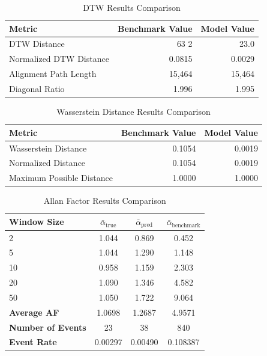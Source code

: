\begin{table}[H]
    \centering
    \caption{DTW Results Comparison} \label{tb:dtw_com}
    \begin{tabular}{lrr}
    \toprule
    Metric & Benchmark Value & Model Value\\
    \midrule
    DTW Distance & 63 2& 23.0 \\  %
    Normalized DTW Distance & 0.0815 & 0.0029 \\  %
    Alignment Path Length & 15,464 & 15,464 \\
    Diagonal Ratio & 1.996 & 1.995 \\   %
    \bottomrule
    \end{tabular}
\end{table}

\begin{table}[H]
    \centering
    \caption{Wasserstein Distance Results Comparison}
    \label{tb:wasserstein_com}
    \begin{tabular}{lrr}
    \toprule
    Metric & Benchmark Value & Model Value\\
    \midrule
    Wasserstein Distance & 0.1054 & 0.0019 \\  %
    Normalized Distance & 0.1054 & 0.0019 \\  %
    Maximum Possible Distance & 1.0000 & 1.0000 \\
    \bottomrule
    \end{tabular}
\end{table}

\begin{table}[H]
    \centering
    \caption{Allan Factor Results Comparison}
    \label{tb:allan-factor_com}
    \begin{tabular}{lccc}
    \toprule
    \textbf{Window Size} & $\bar{\alpha}_\text{true}$ & $\bar{\alpha}_\text{pred}$ & $\bar{\alpha}_\text{benchmark}$ \\
    \midrule
    2   & 1.044 & 0.869 & 0.452 \\
    5   & 1.044 & 1.290 & 1.148 \\
    10  & 0.958 & 1.159 & 2.303 \\
    20  & 1.090 & 1.346 & 4.582 \\
    50  & 1.050 & 1.722 & 9.064 \\
    \midrule
    \textbf{Average AF} & 1.0698 & 1.2687 & 4.9571 \\
    \textbf{Number of Events} & 23 & 38 & 840 \\
    \textbf{Event Rate} & 0.00297 & 0.00490 & 0.108387 \\
    \bottomrule
    \end{tabular}
\end{table}

